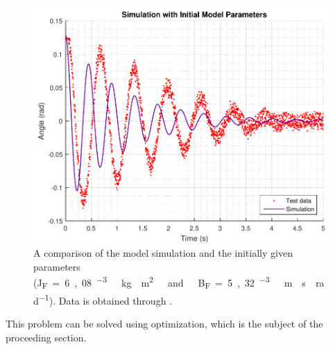\begin{figure}[H] 
	\centering
	\includegraphics[width=.6\textwidth]{figures/InitialModelParameterCompare}
	\caption{A comparison of the model simulation and the initially given parameters (\si{J_F=6,08 ^{-3}\ kg \cdot m^2\ and\ B_F=5,32 ^{-3}\ m \cdot s \cdot rad^{-1}}). Data is obtained through .}
	\label{InitialModelParameterCompare}
\end{figure}\vspace{-18pt}
This problem can be solved using optimization, which is the subject of the proceeding section.